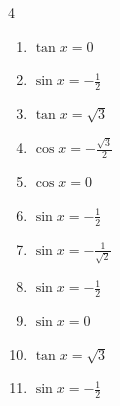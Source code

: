 \begin{multicols}{4}
\begin{enumerate}

  \item $\displaystyle \tan{x}  = 0$

        \phantom{$\displaystyle x = 0 , \pi$}

  \item $\displaystyle \sin{x}  = -\frac{1}{2}$


  \item $\displaystyle \tan{x}  = \sqrt{3}$


  \item $\displaystyle \cos{x}  = -\frac{\sqrt{3}}{2}$


  \item $\displaystyle \cos{x}  = 0$


  \item $\displaystyle \sin{x}  = -\frac{1}{2}$


  \item $\displaystyle \sin{x}  = -\frac{1}{\sqrt{2}}$


  \item $\displaystyle \sin{x}  = -\frac{1}{2}$


\columnbreak %

  \item $\displaystyle \sin{x}  = 0$

        \phantom{$\displaystyle x = 0 , \pi$}

  \item $\displaystyle \tan{x}  = \sqrt{3}$


  \item $\displaystyle \sin{x}  = -\frac{1}{2}$


\end{enumerate}
\end{multicols}
